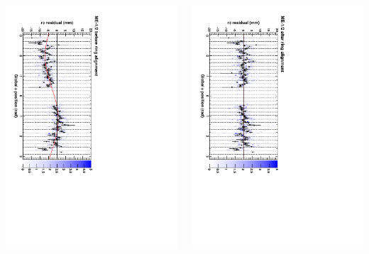 \documentclass[compress]{beamer}
\begin{document}
\begin{frame}
\begin{columns}
\includegraphics[height=\linewidth, angle=90]{ringfits_before_mem12.pdf}

\includegraphics[height=\linewidth, angle=90]{ringfits_after_mem12.pdf}
\end{columns}
\end{frame}
\end{document}
